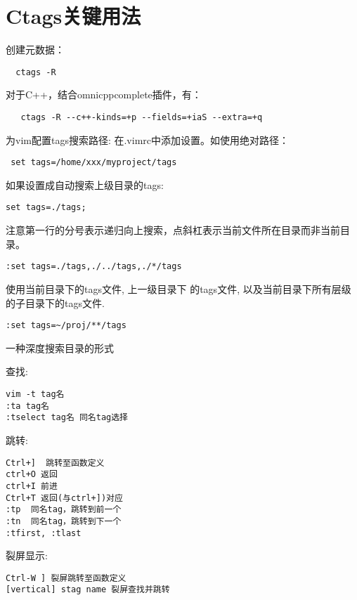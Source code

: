 \section{Ctags关键用法}

创建元数据：
\begin{verbatim}
  ctags -R
\end{verbatim}
  对于C++，结合omnicppcomplete插件，有：
\begin{verbatim}
   ctags -R --c++-kinds=+p --fields=+iaS --extra=+q
\end{verbatim}

为vim配置tags搜索路径:
在.vimrc中添加设置。如使用绝对路径：
\begin{verbatim}
 set tags=/home/xxx/myproject/tags
\end{verbatim}

如果设置成自动搜索上级目录的tags:
\begin{verbatim}
set tags=./tags;
\end{verbatim}
注意第一行的分号表示递归向上搜索，点斜杠表示当前文件所在目录而非当前目录。

\begin{verbatim}
:set tags=./tags,./../tags,./*/tags
\end{verbatim}
使用当前目录下的tags文件, 上一级目录下
的tags文件, 以及当前目录下所有层级的子目录下的tags文件.


\begin{verbatim}
:set tags=~/proj/**/tags
\end{verbatim}
一种深度搜索目录的形式

查找:
\begin{verbatim}
vim -t tag名
:ta tag名
:tselect tag名 同名tag选择

\end{verbatim}

跳转:
\begin{verbatim}
Ctrl+]  跳转至函数定义
ctrl+O 返回
ctrl+I 前进
Ctrl+T 返回(与ctrl+])对应
:tp  同名tag，跳转到前一个
:tn  同名tag，跳转到下一个
:tfirst, :tlast 
\end{verbatim}


裂屏显示:
\begin{verbatim}
Ctrl-W ] 裂屏跳转至函数定义
[vertical] stag name 裂屏查找并跳转
\end{verbatim}


